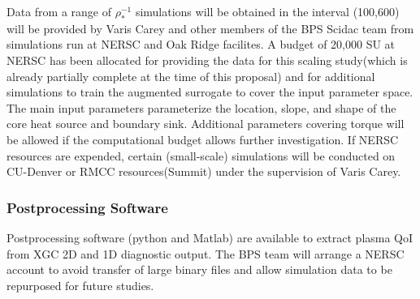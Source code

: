 \documentclass{article}
\begin{document}
Data from a range of $\rho^{-1}_*$ simulations will be obtained in the interval (100,600) will be provided by Varis Carey and other members
of the BPS Scidac team  from simulations run at NERSC and Oak Ridge facilites.  A budget of 20,000 SU at NERSC has been allocated for providing the data for this scaling study(which is already partially complete at the time of this proposal)
 and for additional simulations to train the augmented surrogate to cover the input parameter space.
The main input parameters parameterize the location, slope, and shape of the core heat source and boundary sink.  Additional parameters covering
torque will be allowed if the computational budget allows further investigation.  If NERSC resources are expended, certain (small-scale)
simulations will be conducted on CU-Denver or RMCC resources(Summit) under the supervision of Varis Carey.

\subsubsection*{Postprocessing Software}
Postprocessing software (python and Matlab) are available to extract plasma QoI from  XGC 2D and 1D diagnostic output.  The BPS team will
arrange a NERSC account to avoid transfer of large binary files and allow simulation data to be repurposed for future studies.

%

%
\end{document}
